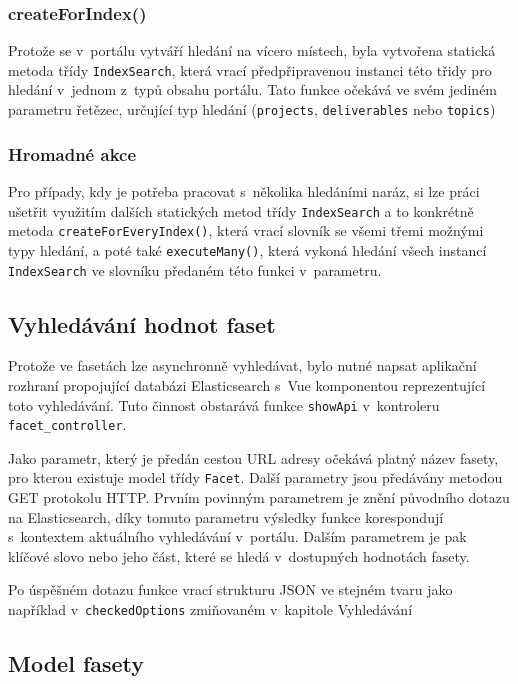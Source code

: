 \subsubsection*{createForIndex()}
Protože se v~portálu vytváří hledání na vícero místech, byla vytvořena statická metoda třídy \texttt{IndexSearch}, která vrací předpřipravenou instanci této třidy pro hledání v~jednom z~typů obsahu portálu. Tato funkce očekává ve svém jediném parametru řetězec, určující typ hledání (\texttt{projects}, \texttt{deliverables} nebo \texttt{topics})

\subsubsection*{Hromadné akce}
Pro případy, kdy je potřeba pracovat s~několika hledáními naráz, si lze práci ušetřit využitím dalších statických metod třídy \texttt{IndexSearch} a to konkrétně metoda \texttt{createForEveryIndex()}, která vrací slovník se všemi třemi možnými typy hledání, a poté také \texttt{executeMany()}, která vykoná hledání všech instancí \texttt{IndexSearch} ve slovníku předaném této funkci v~parametru. 

\subsection{Vyhledávání hodnot faset}
Protože ve fasetách lze asynchronně vyhledávat, bylo nutné napsat aplikační rozhraní propojující databázi Elasticsearch s~Vue komponentou reprezentující toto vyhledávání. Tuto činnost obstarává funkce \texttt{showApi} v~kontroleru \texttt{facet\_controller}.

Jako parametr, který je předán cestou URL adresy očekává platný název fasety, pro kterou existuje model třídy \texttt{Facet}. Další parametry jsou předávány metodou GET protokolu HTTP. Prvním povinným parametrem je znění původního dotazu na Elasticsearch, díky tomuto parametru výsledky funkce korespondují s~kontextem aktuálního vyhledávání v~portálu. Dalším parametrem je pak klíčové slovo nebo jeho část, které se hledá v~dostupných hodnotách fasety. 

Po úspěšném dotazu funkce vrací strukturu JSON ve stejném tvaru jako například v~\texttt{checkedOptions} zmiňovaném v~kapitole Vyhledávání %

\subsection{Model fasety}
\blindtext[2]



